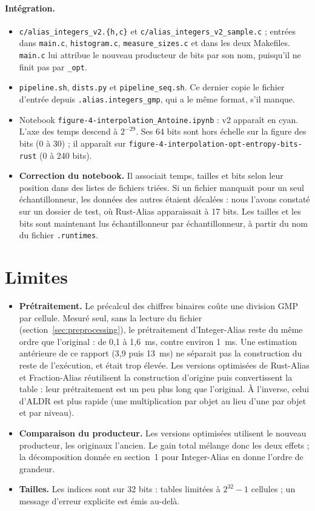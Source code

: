 \documentclass[11pt,a4paper]{article}
\newcommand{\code}[1]{\texttt{#1}}
\begin{document}
\paragraph{Intégration.}
\begin{itemize}
\item \code{c/alias\_integers\_v2.\{h,c\}} et \code{c/alias\_integers\_v2\_sample.c} ;
  entrées dans \code{main.c}, \code{histogram.c}, \code{measure\_sizes.c} et dans les
  deux Makefiles. \code{main.c} lui attribue le nouveau producteur de bits par son
  nom, puisqu'il ne finit pas par \code{\_opt}.
\item \code{pipeline.sh}, \code{dists.py} et \code{pipeline\_seq.sh}. Ce dernier copie
  le fichier d'entrée depuis \code{.alias.integers\_gmp}, qui a le même format, s'il
  manque.
\item Notebook \code{figure-4-interpolation\_Antoine.ipynb} : v2 apparaît en cyan.
  L'axe des temps descend à $2^{-29}$. Ses 64 bits sont hors échelle sur la figure des
  bits (0 à 30) ; il apparaît sur \code{figure-4-interpolation-opt-entropy-bits-rust}
  (0 à 240 bits).
\item \textbf{Correction du notebook.} Il associait temps, tailles et bits selon leur
  position dans des listes de fichiers triées. Si un fichier manquait pour un seul
  échantillonneur, les données des autres étaient décalées : nous l'avons constaté sur
  un dossier de test, où Rust-Alias apparaissait à 17 bits. Les tailles et les bits sont
  maintenant lus échantillonneur par échantillonneur, à partir du nom du fichier
  \code{.runtimes}.
\end{itemize}

\section{Limites}

\begin{itemize}
\item \textbf{Prétraitement.} Le précalcul des chiffres binaires coûte une division GMP
  par cellule. Mesuré seul, sans la lecture du fichier
  (section~\ref{sec:preprocessing}), le prétraitement d'Integer-Alias reste du même
  ordre que l'original : de 0,1 à 1,6~ms, contre environ 1~ms. Une estimation
  antérieure de ce rapport (3,9 puis 13~ms) ne séparait pas la construction du reste de
  l'exécution, et était trop élevée. Les versions optimisées de Rust-Alias et
  Fraction-Alias réutilisent la construction d'origine puis convertissent la table :
  leur prétraitement est un peu plus long que l'original. À l'inverse, celui d'ALDR
  est plus rapide (une multiplication par objet au lieu d'une par objet et par niveau).
\item \textbf{Comparaison du producteur.} Les versions optimisées utilisent le nouveau
  producteur, les originaux l'ancien. Le gain total mélange donc les deux effets ;
  la décomposition donnée en section~1 pour Integer-Alias en donne l'ordre de grandeur.
\item \textbf{Tailles.} Les indices sont sur 32 bits : tables limitées à $2^{32}-1$
  cellules ; un message d'erreur explicite est émis au-delà.
\end{itemize}
\end{document}

